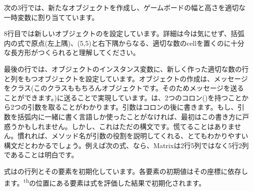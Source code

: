 \documentclass[a4paper,10pt,twoside]{book}
\begin{document}
次の3行では、新たなオブジェクトを作成し、ゲームボードの幅と高さを適切な一時変数に割り当てています。

8行目では新しいオブジェクトのを設定しています。詳細は今は気にせず、括弧内の式で原点(\ie 左上隅)、(5,5)と右下隅からなる、適切な数のcellを置くのに十分な長方形がつくられると理解してください。

最後の行では、オブジェクトのインスタンス変数に、新しく作った適切な数の行と列をもつオブジェクトを設定しています。オブジェクトの作成は、メッセージをクラス(このクラスももちろんオブジェクトです。そのためメッセージを送ることができます。)に送ることで実現しています。は、2つのコロン(\ct{:})を持つことから2つの引数を取ることがわかります。引数はコロンの後に書きます。もし、引数を括弧内に一緒に書く言語しか使ったことがなければ、最初はこの書き方に戸惑うかもしれません。しかし、これはただの構文です。慌てることはありません。慣れれば、メソッド名が引数の役割を説明してくれる、とてもわかりやすい構文だとわかるでしょう。例えば次の式、なら、Matrixは2行5列ではなく5行2列であることは明白です。


式はの行列とその要素を初期化しています。各要素の初期値はその座標に依存します。\textsuperscript{th}の位置にある要素は式を評価した結果で初期化されます。



\end{document}
